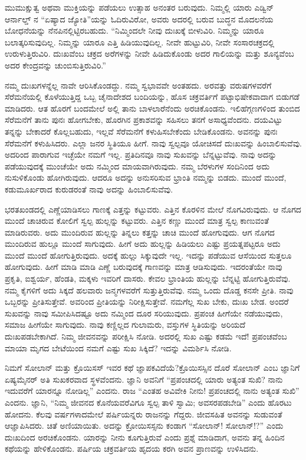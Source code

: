 ಮುಮುಕ್ಷುತ್ವ ಅಥವಾ ಮುಕ್ತಿಯನ್ನು ಪಡೆಯಲು ಉತ್ಸಾಹ ಅನಂತರ ಬರುವುದು. ನಿಮ್ಮಲ್ಲಿ ಯಾರು ಎಡ್ವಿನ್ ಆರ್ನಾಲ್ಡ್ ನ “ಏಷ್ಯಾದ ಜ್ಯೋತಿ”ಯನ್ನು ಓದಿರುವಿರೋ, ಅವರು ಅದರಲ್ಲಿ ಬರುವ ಬುದ್ಧನ ಮೊದಲನೆಯ ಬೋಧನೆಯನ್ನು ನೆನಪಿನಲ್ಲಿಟ್ಟಿರಬಹುದು. “ನಿಮ್ಮಿಂದಲೇ ನೀವು ದುಃಖಕ್ಕೆ ಬೀಳುವಿರಿ. ನಿಮ್ಮನ್ನು ಯಾರೂ ಬಲಾತ್ಕರಿಸುವುದಿಲ್ಲ. ನಿಮ್ಮನ್ನು ಯಾರೂ ಎತ್ತಿ ಹಿಡಿಯುವುದಿಲ್ಲ. ನೀವೇ ಹುಟ್ಟುವಿರಿ, ನೀವೇ ಸಂಸಾರಚಕ್ರದಲ್ಲಿ ಉರುಳುತ್ತಿರುವಿರಿ. ದುಃಖವೆಂಬ ಚಕ್ರದ ಅರೆಗಳನ್ನು ನೀವೇ ಹಿಡಿದುಕೊಂಡು ಅದರ ಗಾಲಿಯನ್ನು ಮತ್ತು ಶೂನ್ಯವೆಂಬ ಅದರ ಕೇಂದ್ರವನ್ನು ಚುಂಬಿಸುತ್ತಿರುವಿರಿ.”

ನಮ್ಮ ದುಃಖಗಳನ್ನೆಲ್ಲ ನಾವೇ ಆರಿಸಿಕೊಂಡದ್ದು. ನಮ್ಮ ಸ್ವಭಾವವೇ ಅಂತಹದು. ಅರವತ್ತು ವರುಷಗಳವರೆಗೆ ಸೆರೆಮನೆಯಲ್ಲಿ ಕೊಳೆಯುತ್ತಿದ್ದ ಒಬ್ಬ ಚೈನಾದೇಶದ ಬಂದಿಯನ್ನು, ಹೊಸ ಚಕ್ರವರ್ತಿಗೆ ಪಟ್ಟಾಭಿಷೇಕವಾದಾಗ ಬಿಡುಗಡೆ ಮಾಡಿದರು. ಆತ ಹೊರಗೆ ಬಂದಮೇಲೆ ಅಲ್ಲಿ ತಾನು ಬಾಳಲಾರೆನೆಂದು ಅರಚಿಕೊಂಡನು. ಇಲಿ\break ಹೆಗ್ಗಣಗಳಿಂದ ತುಂಬಿದ ಸೆರೆಮನೆಗೆ ತಾನು ಪುನಃ ಹೋಗಬೇಕು, ಹೊರಗಿನ ಪ್ರಕಾಶವನ್ನು ಸಹಿಸಲು ತನಗೆ ಅಸಾಧ್ಯವೆಂದನು. ದಯವಿಟ್ಟು ತನ್ನನ್ನು ಬೇಕಾದರೆ ಕೊಲ್ಲಬಹುದು, ಇಲ್ಲವೆ ಸೆರೆಮನೆಗೆ ಕಳುಹಿಸಬೇಕೆಂದು ಬೇಡಿಕೊಂಡನು. ಅವನನ್ನು ಪುನಃ ಸೆರೆಮನೆಗೆ ಕಳುಹಿಸಿದರು. ಎಲ್ಲಾ ಜನರ ಸ್ಥಿತಿಯೂ ಹೀಗೆ. ನಾವು ಸ್ವಲ್ಪವೂ ಯೋಚಿಸದೆ ದುಃಖವನ್ನು ಹಿಂಬಾಲಿಸುವೆವು. ಅದರಿಂದ ಪಾರಾಗುವ ಇಚ್ಛೆಯೇ ನಮಗೆ ಇಲ್ಲ. ಪ್ರತಿದಿನವೂ ನಾವು ಸುಖವನ್ನು ಬೆನ್ನಟ್ಟುವೆವು. ನಾವು ಅದನ್ನು ಪಡೆಯುವುದಕ್ಕೆ ಮುಂಚೆಯೇ ಅದು ನಮ್ಮಿಂದ ಮಾಯವಾಗಿರುವುದು. ನಮ್ಮ ಬೆರಳುಗಳ ಸಂದಿನಿಂದ ಅದು ನುಸುಳಿಕೊಂಡು ಹೋಗಿರುವುದು. ಆದರೂ ಅದನ್ನು ಅನುಸರಿಸುವ ಭ್ರಾಂತಿ ನಮ್ಮನ್ನು ಬಿಡದು. ಮುಂದೆ ಮುಂದೆ, ಕಡುಮೂರ್ಖರಾದ ಕುರುಡರಂತೆ ನಾವು ಅದನ್ನು ಹಿಂಬಾಲಿಸುವೆವು.

ಭರತಖಂಡದಲ್ಲಿ ಎಣ್ಣೆಯಾಡಿಸಲು ಗಾಣಕ್ಕೆ ಎತ್ತನ್ನು ಕಟ್ಟುವರು. ಎತ್ತಿನ ಕೊರಳಿನ ಮೇಲೆ ನೊಗವಿರುವುದು. ಆ ನೊಗದ ಮುಂದೆ ಚಾಚಿರುವ ಕೋಲಿಗೆ ಸ್ವಲ್ಪ ಹುಲ್ಲನ್ನು ಕಟ್ಟುವರು. ಎತ್ತಿನ ಕಣ್ಣು ಮುಂದೆ ಮಾತ್ರ ಸ್ವಲ್ಪ ಕಾಣುವಂತೆ ಮಾಡಿರುವರು. ಅದು ಮುಂದಿರುವ ಹುಲ್ಲನ್ನು ತಿನ್ನಲು ಕತ್ತನ್ನು ಚಾಚಿ ಮುಂದೆ ಹೋಗುವುದು. ಆಗ ನೊಗದ ಮುಂದಿರುವ ಹುಲ್ಲೂ ಮುಂದೆ ಸಾಗುವುದು. ಹೀಗೆ ಅದು ಹುಲ್ಲನ್ನು ಹಿಡಿಯಲು ಎಷ್ಟು ಪ್ರಯತ್ನಪಟ್ಟರೂ ಅದು ಮುಂದೆ ಮುಂದೆ ಹೋಗುತ್ತಿರುವುದು. ಅದಕ್ಕೆ ಹುಲ್ಲು ಸಿಕ್ಕುವುದೇ ಇಲ್ಲ. ಇದನ್ನು ಪಡೆಯುವ ಆಸೆಯಿಂದ ಸುತ್ತಲೂ ಹೋಗುವುದು. ಹೀಗೆ ಮಾಡಿ ಮಾಡಿ ಎಣ್ಣೆ ಬರುವುದಕ್ಕೆ ಗಾಣವನ್ನು ಮಾತ್ರ ಆಡಿಸುವುದು. ಇದರಂತೆಯೇ ನಾವು ಪ್ರಕೃತಿ, ಐಶ್ವರ್ಯ, ಹೆಂಡತಿ, ಮಕ್ಕಳು ಇವರಿಗೆ ದಾಸರು. ಕೇವಲ ಭ್ರಾಂತಿಯ ಹುಲ್ಲನ್ನು ಬೆನ್ನಟ್ಟಿ ಹೋಗುತ್ತಿರುವೆವು. ನಮ್ಮ ಕೈಗಳಿಗೆ ಅದು ಸಿಕ್ಕದೆ ಹಲವಾರು ಜನ್ಮಗಳವರೆಗೆ ಸುತ್ತುತ್ತಿರುವೆವು. ನಮ್ಮ ಒಂದು ದೊಡ್ಡ ಕನಸೇ ಪ್ರೀತಿ. ನಾವು ಒಬ್ಬರನ್ನು ಪ್ರೀತಿಸುತ್ತೇವೆ. ಅವರಿಂದ ಪ್ರೀತಿಯನ್ನು ನಿರೀಕ್ಷಿಸುತ್ತೇವೆ. ನಮಗೆಲ್ಲ ಸುಖ ಬೇಕು, ದುಃಖ ಬೇಡ. ಅಂದರೆ ಸುಖವನ್ನು ನಾವು ಸಮೀಪಿಸಿದಷ್ಟೂ ಅದು ನಮ್ಮಿಂದ ದೂರ ಸರಿಯುವುದು. ಪ್ರಪಂಚ ಹೀಗೆಯೇ ನಡೆಯುವುದು, ಸಮಾಜ ಹೀಗೆಯೇ ಸಾಗುವುದು. ನಾವು ಕಣ್ಣಿಲ್ಲದ ಗುಲಾಮರು, ವಸ್ತುಗಳ ಸ್ಥಿತಿಯನ್ನು ಅರಿಯದೆ ದುಃಖಪಡಬೇಕಾಗಿದೆ. ನಿಮ್ಮ ಜೀವನವನ್ನು ಪರೀಕ್ಷಿಸಿ ನೋಡಿ. ಅದರಲ್ಲಿ ಸುಖ ಎಷ್ಟು ಕಡಮೆ ಇದೆ! ಪ್ರಪಂಚವೆಂಬ ಮಾಯಾ ಮೃಗದ ಬೇಟೆಯಿಂದ ನಮಗೆ ಎಷ್ಟು ಸುಖ ಸಿಕ್ಕಿದೆ? ಇದನ್ನು ವಿಮರ್ಶಿಸಿ ನೋಡಿ.

ನಿಮಗೆ ಸೋಲಾನ್ ಮತ್ತು ಕ್ರೊಯಿಸಸ್ ಇವರ ಕಥೆ ಜ್ಞಾಪಕವಿದೆಯೆ?\break ಕ್ರೊಯಿಸಸ್ಸಿನ ದೊರೆ ಸೋಲಾನ್ ಎಂಬ ಜ್ಞಾನಿಗೆ ಏಷ್ಯಮೈನರ್ ಅತಿ ಸುಖಕರವಾದ ಸ್ಥಳವೆಂದನು. ಜ್ಞಾನಿ ಅವನಿಗೆ “ಪ್ರಪಂಚದಲ್ಲಿ ಯಾರು ಅತ್ಯಂತ ಸುಖಿ? ನಾನು ಇದುವರೆಗೆ ಯಾರನ್ನೂ ನೋಡಿಲ್ಲ” ಎಂದನು. ರಾಜ “ಎಂತಹ ಅವಿವೇಕಿ ನೀನು! ಪ್ರಪಂಚದಲ್ಲಿ ನಾನು ಅತ್ಯಂತ ಸುಖಿ'' ಎಂದನು. ಜ್ಞಾನಿ, “ನಿಮ್ಮ ಜೀವನದ ಕೊನೆಯವರೆವಿಗೂ ಸ್ವಲ್ಪ ತಾಳಿ ಸ್ವಾಮಿ; ಅವಸರಪಡಬೇಡಿ” ಎಂದು ಹೊರಟು ಹೋದನು. ಕೆಲವು ವರ್ಷಗಳಾದಮೇಲೆ ಪರ್ಷಿಯನ್ನರು ರಾಜನನ್ನು ಗೆದ್ದರು. ಜೀವಸಹಿತ ಅವನನ್ನು ಸುಡುವಂತೆ ಆಜ್ಞಾಪಿಸಿದರು. ಚಿತೆ ಅಣಿಯಾಯಿತು. ಅದನ್ನು ಕ್ರೋಯಿಸಸ್ಸನು ಕಂಡಾಗ “ಸೋಲಾನ್! ಸೋಲಾನ್!?” ಎಂದು ದುಃಖದಿಂದ ಅರಚಿಕೊಂಡನು. ಯಾರನ್ನು ನೀನು ಕೂಗುತ್ತಿರುವೆ ಎಂದು ಪ್ರಶ್ನೆ ಮಾಡಿದಾಗ, ಅವನು ತನ್ನ ಹಿಂದಿನ ಕಥೆಯನ್ನು ಹೇಳಿಕೊಂಡನು. ಪರ್ಷಿಯ ಚಕ್ರವರ್ತಿಯ ಹೃದಯ ಕರಗಿ ಅವನ ಪ್ರಾಣವನ್ನು ಉಳಿಸಿದನು.

